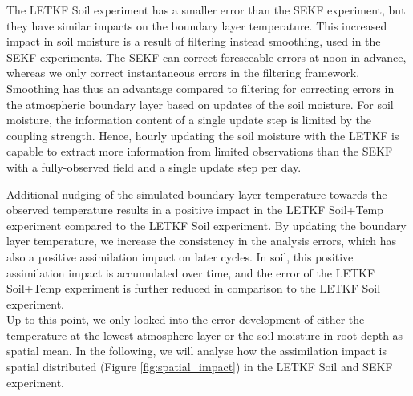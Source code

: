 \documentclass[hess, manuscript]{copernicus}
\begin{document}
The LETKF Soil experiment has a smaller error than the SEKF experiment, but they have similar impacts on the boundary layer temperature.
This increased impact in soil moisture is a result of filtering instead smoothing, used in the SEKF experiments.
The SEKF can correct foreseeable errors at noon in advance, whereas we only correct instantaneous errors in the filtering framework.
Smoothing has thus an advantage compared to filtering for correcting errors in the atmospheric boundary layer based on updates of the soil moisture.
For soil moisture, the information content of a single update step is limited by the coupling strength.
Hence, hourly updating the soil moisture with the LETKF is capable to extract more information from limited observations than the SEKF with a fully-observed field and a single update step per day.

Additional nudging of the simulated boundary layer temperature towards the observed temperature results in a positive impact in the LETKF Soil+Temp experiment compared to the LETKF Soil experiment.
By updating the boundary layer temperature, we increase the consistency in the analysis errors, which has also a positive assimilation impact on later cycles.
In soil, this positive assimilation impact is accumulated over time, and the error of the LETKF Soil+Temp experiment is further reduced in comparison to the LETKF Soil experiment.\\

Up to this point, we only looked into the error development of either the temperature at the lowest atmosphere layer or the soil moisture in root-depth as spatial mean.
In the following, we will analyse how the assimilation impact is spatial distributed (Figure \ref{fig:spatial_impact}) in the LETKF Soil and SEKF experiment.
\end{document}
